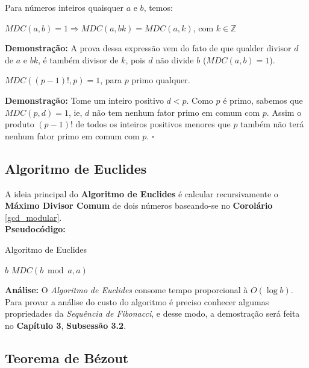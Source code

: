 \begin{corollary}\label{corolario_gcd_produto}
Para números inteiros quaisquer $a$ e $b$, temos:

$MDC(a,b) = 1 \Rightarrow MDC(a,bk) = MDC(a,k)$, com $k \in \mathbb{Z}$
\end{corollary}
\textbf{Demonstração:}
A prova dessa expressão vem do fato de que qualder divisor $d$ de $a$ e $bk$, é também divisor de $k$, pois $d$ não divide $b$ ($MDC(a,b) = 1$).
\\

\begin{corollary}\label{mdc_primo_fatorial}
$MDC((p-1)!, p)=1$, para $p$ primo qualquer.
\end{corollary}
\textbf{Demonstração:}
Tome um inteiro positivo $d < p$. Como $p$ é primo, sabemos que $MDC(p,d)=1$, ie, $d$ não tem nenhum fator primo em comum com $p$. Assim
o produto $(p-1)!$ de todos os inteiros positivos menores que $p$ também não terá nenhum fator primo em comum com $p$. $\square$
\\



\subsection{Algoritmo de Euclides}
A ideia principal do \textbf{Algoritmo de Euclides} é calcular recursivamente o \textbf{Máximo Divisor Comum} de dois números baseando-se no 
\textbf{Corolário} \autoref{gcd_modular}.\\

\textbf{Pseudocódigo:}
\begin{algorithm}
\caption{Algoritmo de Euclides}\label{mdc}
\begin{algorithmic}[1]
\State \Return $b$
\EndIf
\State \Return $MDC(b \bmod a, a)$
\EndProcedure
\end{algorithmic}
\end{algorithm}

\textbf{Análise:}
O \textit{Algoritmo de Euclides} consome tempo proporcional à $O(\log b)$. Para provar a análise do custo do algoritmo é preciso conhecer algumas propriedades da \textit{Sequência de Fibonacci}, e desse modo, a 
demostração será feita no \textbf{Capítulo 3}, \textbf{Subsessão 3.2}.



\subsection{Teorema de Bézout}

